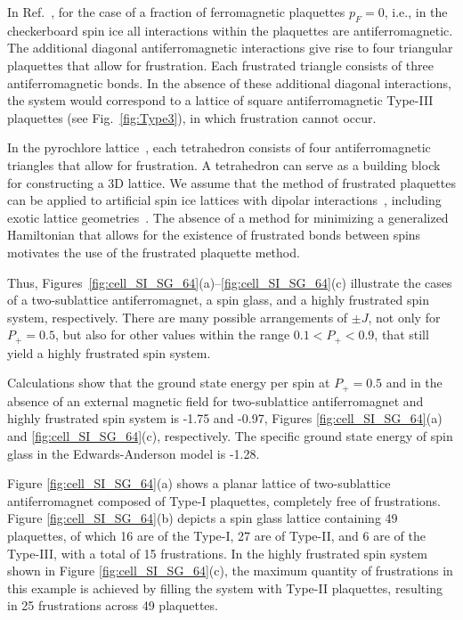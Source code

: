 \documentclass[preprint,12pt]{elsarticle}
\begin{document}
	In Ref.~\cite{kato2022flux}, for the case of a fraction of ferromagnetic plaquettes $p_F = 0$, i.e., in the checkerboard spin ice all interactions within the plaquettes are antiferromagnetic. The additional diagonal antiferromagnetic interactions give rise to four triangular plaquettes that allow for frustration. Each frustrated triangle consists of three antiferromagnetic bonds. In the absence of these additional diagonal interactions, the system would correspond to a lattice of square antiferromagnetic Type-III plaquettes (see Fig.~\ref{fig:Type3}), in which frustration cannot occur.
	
	In the pyrochlore lattice~\cite{peretyatko2017interplay, otsuka2018husimi}, each tetrahedron consists of four antiferromagnetic triangles that allow for frustration. A tetrahedron can serve as a building block for constructing a 3D lattice. We assume that the method of frustrated plaquettes can be applied to artificial spin ice lattices with dipolar interactions~\cite{andriushchenko2019large, shevchenko2017effect}, including exotic lattice geometries~\cite{makarova2021low, shevchenko2022order, makarov2019numerical}. The absence of a method for minimizing a generalized Hamiltonian that allows for the existence of frustrated bonds between spins motivates the use of the frustrated plaquette method.
	
	Thus, Figures~\ref{fig:cell_SI_SG_64}(a)--\ref{fig:cell_SI_SG_64}(c) illustrate the cases of a two-sublattice antiferromagnet, a spin glass, and a highly frustrated spin system, respectively.
	There are many possible arrangements of $\pm J$, not only for $P_+=0.5$, but also for other values within the range $0.1<P_+<0.9$, that still yield a highly frustrated spin system.
	
	
	Calculations show that the ground state energy per spin at $P_+ = 0.5$ and in the absence of an external magnetic field for two-sublattice antiferromagnet and highly frustrated spin system is -1.75 and -0.97, Figures \ref{fig:cell_SI_SG_64}(a) and \ref{fig:cell_SI_SG_64}(c), respectively. The specific ground state energy of spin glass in the Edwards-Anderson model is -1.28.
	
	Figure \ref{fig:cell_SI_SG_64}(a) shows a planar lattice of two-sublattice antiferromagnet composed of Type-I plaquettes, completely free of frustrations.
	Figure \ref{fig:cell_SI_SG_64}(b) depicts a spin glass lattice containing 49 plaquettes, of which 16 are of the Type-I, 27 are of Type-II, and 6 are of the Type-III, with a total of 15 frustrations.
	In the highly frustrated spin system shown in Figure \ref{fig:cell_SI_SG_64}(c), the maximum quantity of frustrations in this example is achieved by filling the system with Type-II plaquettes, resulting in 25 frustrations across 49 plaquettes.
	
\end{document}
